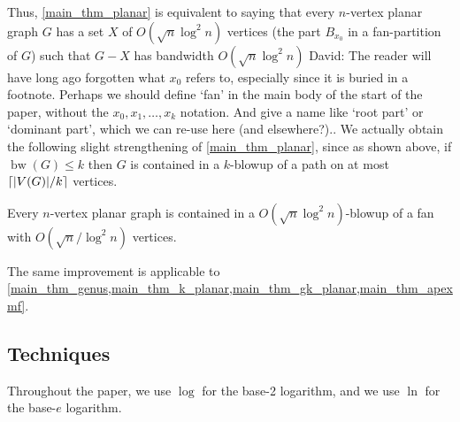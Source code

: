 \documentclass{patmorin}
\renewcommand{\leq}{\leqslant}
\newcommand{\david}[1]{{\color{orange} David: #1}}
\newcommand{\pat}[1]{\textcolor{Blue}{Pat: #1}}
\DeclareMathOperator{\bw}{bw}
\begin{document}
Thus, \cref{main_thm_planar} is equivalent to saying that every $n$-vertex planar graph $G$ has a set $X$ of  $O(\sqrt{n}\log^2 n)$ vertices (the part $B_{x_0}$ in a fan-partition of $G$) such that $G-X$ has bandwidth $O(\sqrt{n}\log^2 n)$ \david{The reader will have long ago forgotten what $x_0$ refers to, especially since it is buried in a footnote. Perhaps we should define `fan' in the main body of the start of the paper, without the $x_0,x_1,\dots,x_k$ notation. And give a name like `root part'  or `dominant part', which we can re-use here (and elsewhere?).}. We actually obtain the following slight strengthening of \cref{main_thm_planar}, since as shown above, if $\bw(G)\leq k$ then $G$ is contained in a $k$-blowup of a path on at most ${\lceil |V(G)|/k \rceil}$ vertices.

\begin{thm}\label{main_thm_planar_order}
  Every $n$-vertex planar graph is contained in a $O(\sqrt{n}\log^2 n)$-blowup of a fan with
  $O(\sqrt{n}/\log^2 n)$ vertices.
\end{thm}

The same improvement is applicable to \cref{main_thm_genus,main_thm_k_planar,main_thm_gk_planar,main_thm_apexmf}.



\subsection{Techniques}


Throughout the paper, we use $\log$ for the base-2 logarithm, and we use $\ln$ for the base-$e$ logarithm.
\end{document}
